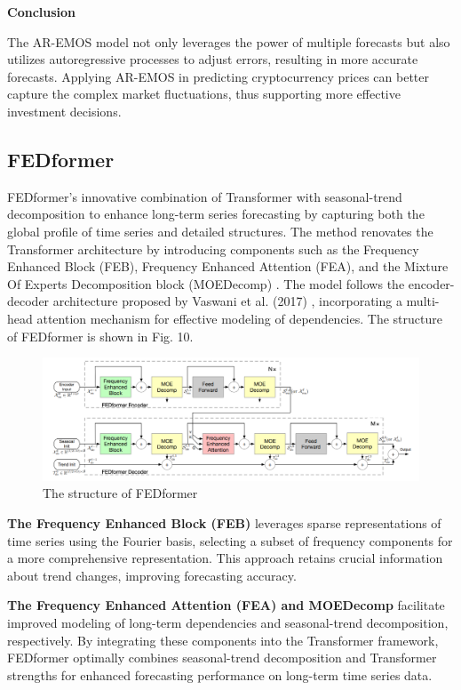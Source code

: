 \documentclass{ieeeojies}
\begin{document}
\textbf{Conclusion}

The AR-EMOS model not only leverages the power of multiple forecasts but also utilizes autoregressive processes to adjust errors, resulting in more accurate forecasts. Applying AR-EMOS in predicting cryptocurrency prices can better capture the complex market fluctuations, thus supporting more effective investment decisions.
\subsection{FEDformer}
FEDformer's innovative combination of Transformer with seasonal-trend decomposition to enhance long-term series forecasting by capturing both the global profile of time series and detailed structures. The method renovates the Transformer architecture by introducing components such as the Frequency Enhanced Block (FEB), Frequency Enhanced Attention (FEA), and the Mixture Of Experts Decomposition block (MOEDecomp) \cite{b22}. The model follows the encoder-decoder architecture proposed by Vaswani et al. (2017) \cite{b23}, incorporating a multi-head attention mechanism for effective modeling of dependencies. The structure of FEDformer is shown in Fig. 10.
\begin{figure}[H]
  \centering
  \begin{minipage}{1\linewidth}
    \centering
    \includegraphics[width=\linewidth]{bibliography/Figure/models/fedformer.png}
    \caption{The structure of FEDformer }
    \label{fig9}
  \end{minipage}
\end{figure}

\textbf{The Frequency Enhanced Block (FEB)} leverages sparse representations of time series using the Fourier basis, selecting a subset of frequency components for a more comprehensive representation. This approach retains crucial information about trend changes, improving forecasting accuracy.

\textbf{The Frequency Enhanced Attention (FEA) and MOEDecomp} facilitate improved modeling of long-term dependencies and seasonal-trend decomposition, respectively. By integrating these components into the Transformer framework, FEDformer optimally combines seasonal-trend decomposition and Transformer strengths for enhanced forecasting performance on long-term time series data.
\end{document}
